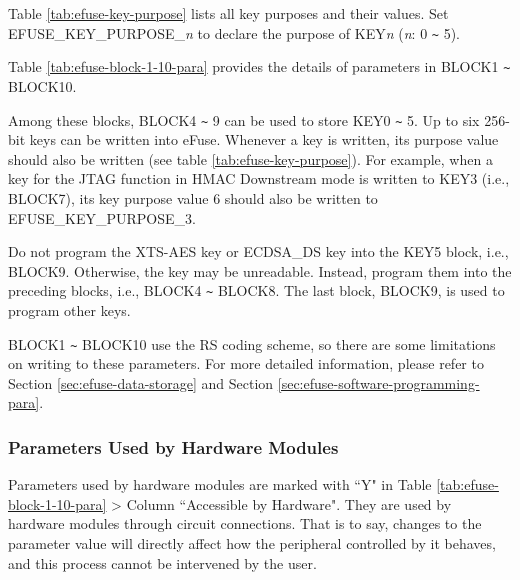 \documentclass[main\_\_EN.tex]{subfiles}
\begin{document}
\clearpage
\begin{landscape}



\end{landscape}
\restoregeometry
\clearpage


Table \ref{tab:efuse-key-purpose} lists all key purposes and their values. Set EFUSE\_KEY\_PURPOSE\_\textcolor{myred}{\it{n}} to declare the purpose of KEY\textcolor{myred}{\it{n}} (\textcolor{myred}{\it{n}}: 0 \verb+~+ 5).



Table \ref{tab:efuse-block-1-10-para} provides the details of parameters in BLOCK1 \verb+~+ BLOCK10.


\clearpage
\begin{landscape}

\end{landscape}
\restoregeometry
\clearpage

Among these blocks, BLOCK4 \verb+~+ 9 can be used to store KEY0 \verb+~+ 5. Up to six 256-bit keys can be written into eFuse. Whenever a key is written, its purpose value should also be written (see table \ref{tab:efuse-key-purpose}). For example, when a key for the JTAG function in HMAC Downstream mode is written to KEY\textcolor{myred}{3} (i.e., BLOCK7), its key purpose value 6 should also be written to EFUSE\_KEY\_PURPOSE\_\textcolor{myred}{3}.

\begin{tiplisting}
Do not program the XTS-AES key or ECDSA\_DS key into the KEY5 block, i.e., BLOCK9. Otherwise, the key may be unreadable. Instead, program them into the preceding blocks, i.e., BLOCK4 \verb+~+ BLOCK8. The last block, BLOCK9, is used to program other keys.
\end{tiplisting}

BLOCK1 \verb+~+ BLOCK10 use the RS coding scheme, so there are some limitations on writing to these parameters. For more detailed information, please refer to Section \ref{sec:efuse-data-storage} and Section \ref{sec:efuse-software-programming-para}.

\subsubsection{Parameters Used by Hardware Modules}
\label{sec:para-hw-modules}

Parameters used by hardware modules are marked with ``Y" in Table \ref{tab:efuse-block-1-10-para} > Column ``Accessible by Hardware". They are used by hardware modules through circuit connections. That is to say, changes to the parameter value will directly affect how the peripheral controlled by it behaves, and this process cannot be intervened by the user.
\end{document}
